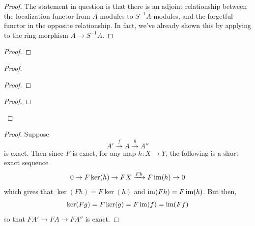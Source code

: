 \documentclass[12pt]{exam}
\begin{document}
\begin{proof}
	The statement in question is that there is an adjoint relationship between the localization functor from $A$-modules to $S^{-1}A$-modules, and the forgetful functor in the opposite relationship. In fact, we've already shown this by applying  to the ring morphism $A \to S^{-1}A$.
\end{proof}

\begin{proof}
\end{proof}

\begin{proof}

\begin{proof}
\end{proof}

\begin{proof}
\end{proof}
\end{proof}

\begin{proof}
	Suppose
	\[ A' \xrightarrow{f} A \xrightarrow{g} A'' \]
	is exact. Then since $F$ is exact, for any map $h : X \to Y$, the following is a short exact sequence
	\[ 0 \to F\ker(h) \to FX \xrightarrow{Fh} F\operatorname{im}(h) \to 0 \]
	which gives that $\ker(Fh) = F\ker(h)$ and $\operatorname{im}(Fh) = F\operatorname{im}(h)$. But then,
	\[ \ker(Fg) = F\ker(g) = F\operatorname{im}(f) = \operatorname{im}(Ff) \]
	so that $FA' \to FA \to FA''$ is exact.
\end{proof}
\end{document}
